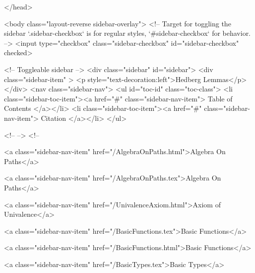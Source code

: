   
</head>




  <body class="layout-reverse sidebar-overlay">
    <!-- Target for toggling the sidebar `.sidebar-checkbox` is for regular
     styles, `#sidebar-checkbox` for behavior. -->
<input type="checkbox" class="sidebar-checkbox" id="sidebar-checkbox" checked>

<!-- Toggleable sidebar -->
<div class="sidebar" id="sidebar">
  <div class="sidebar-item" >
    <p style="text-decoration:left">Hedberg Lemmas</p>
  </div>
  <nav class="sidebar-nav">
    <ul id="toc-id" class="toc-class">
  <li class="sidebar-toc-item"><a href="#" class="sidebar-nav-item"> Table of Contents </a></li>
  <li class="sidebar-toc-item"><a href="#" class="sidebar-nav-item"> Citation </a></li>
</ul>


    <!--  -->
    <!-- 
      
    
      
    
      
    
      
        
      
    
      
        
          <a class="sidebar-nav-item" href="/AlgebraOnPaths.html">Algebra On Paths</a>
        
      
    
      
        
          <a class="sidebar-nav-item" href="/AlgebraOnPaths.tex">Algebra On Paths</a>
        
      
    
      
        
          <a class="sidebar-nav-item" href="/UnivalenceAxiom.html">Axiom of Univalence</a>
        
      
    
      
        
          <a class="sidebar-nav-item" href="/BasicFunctions.tex">Basic Functions</a>
        
      
    
      
        
          <a class="sidebar-nav-item" href="/BasicFunctions.html">Basic Functions</a>
        
      
    
      
        
          <a class="sidebar-nav-item" href="/BasicTypes.tex">Basic Types</a>
        
      
    
      
        
